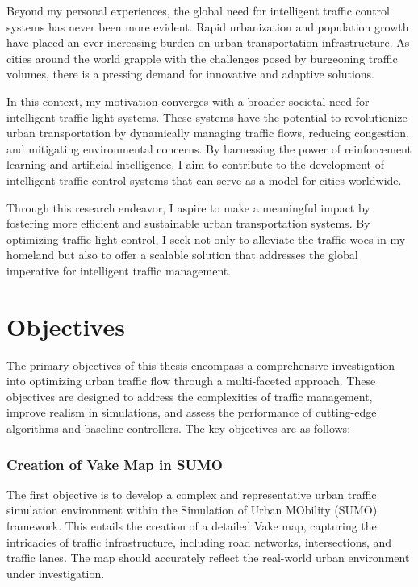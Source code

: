Beyond my personal experiences, the global need for intelligent traffic control systems has never been more evident. Rapid urbanization and population growth have placed an ever-increasing burden on urban transportation infrastructure. As cities around the world grapple with the challenges posed by burgeoning traffic volumes, there is a pressing demand for innovative and adaptive solutions.

In this context, my motivation converges with a broader societal need for intelligent traffic light systems. These systems have the potential to revolutionize urban transportation by dynamically managing traffic flows, reducing congestion, and mitigating environmental concerns. By harnessing the power of reinforcement learning and artificial intelligence, I aim to contribute to the development of intelligent traffic control systems that can serve as a model for cities worldwide.

Through this research endeavor, I aspire to make a meaningful impact by fostering more efficient and sustainable urban transportation systems. By optimizing traffic light control, I seek not only to alleviate the traffic woes in my homeland but also to offer a scalable solution that addresses the global imperative for intelligent traffic management.


\section{Objectives}
The primary objectives of this thesis encompass a comprehensive investigation into optimizing urban traffic flow through a multi-faceted approach. These objectives are designed to address the complexities of traffic management, improve realism in simulations, and assess the performance of cutting-edge algorithms and baseline controllers. The key objectives are as follows:

\subsubsection{Creation of Vake Map in SUMO}
The first objective is to develop a complex and representative urban traffic simulation environment within the Simulation of Urban MObility (SUMO) framework. This entails the creation of a detailed Vake map, capturing the intricacies of traffic infrastructure, including road networks, intersections, and traffic lanes. The map should accurately reflect the real-world urban environment under investigation.

